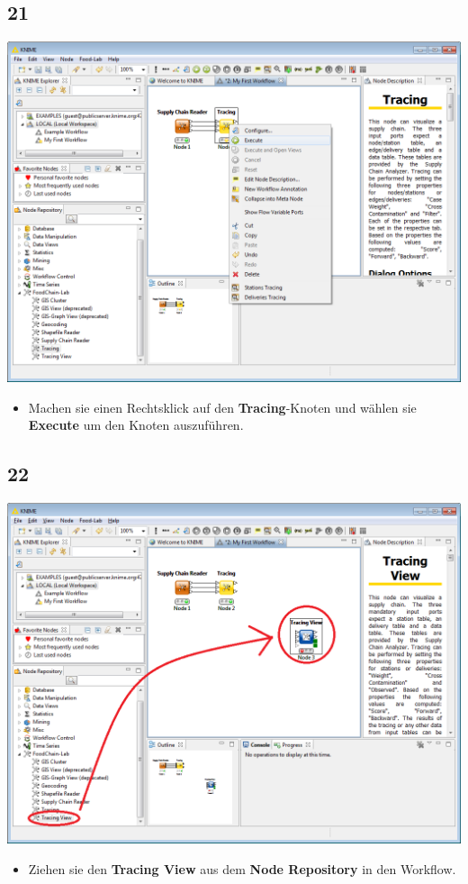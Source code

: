 \documentclass{beamer}
\begin{document}
\subsection{21}
\begin{frame}
	\begin{center}
  		\includegraphics[height=0.6\textheight]{21.png}
	\end{center}
	\begin{itemize}
		\item Machen sie einen Rechtsklick auf den \textbf{Tracing}-Knoten und wählen sie \textbf{Execute} um den Knoten auszuführen.
	\end{itemize}
\end{frame}

\subsection{22}
\begin{frame}
	\begin{center}
  		\includegraphics[height=0.6\textheight]{22.png}
	\end{center}
	\begin{itemize}
		\item Ziehen sie den \textbf{Tracing View} aus dem \textbf{Node Repository} in den Workflow.
	\end{itemize}
\end{frame}
\end{document}
